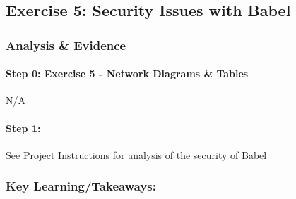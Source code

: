 \documentclass[main.tex]{subfiles}
\begin{document}
\subsection{Exercise 5: Security Issues with Babel}
\subsubsection{Analysis \& Evidence }
\paragraph{Step 0: Exercise 5 - Network Diagrams \& Tables}
\hfill \break
N/A

\paragraph{Step 1: }
\hfill \break

\noindent See Project Instructions for analysis of the security of Babel

\subsubsection{Key Learning/Takeaways:} 
\end{document}
